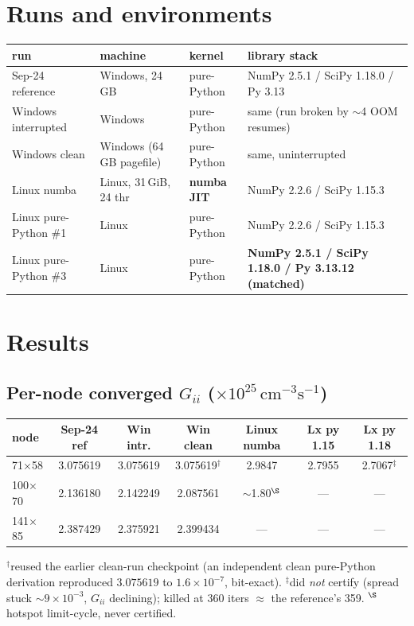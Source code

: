\documentclass[11pt]{article}
\newcommand{\ten}[1]{\times 10^{#1}}
\begin{document}
\section{Runs and environments}
\begin{center}\small
\begin{tabular}{llll}
\toprule
run & machine & kernel & library stack \\
\midrule
Sep-24 reference      & Windows, 24\,GB & pure-Python & NumPy 2.5.1 / SciPy 1.18.0 / Py 3.13 \\
Windows interrupted   & Windows & pure-Python & same (run broken by $\sim$4 OOM resumes) \\
Windows clean         & Windows (64\,GB pagefile) & pure-Python & same, uninterrupted \\
Linux numba           & Linux, 31\,GiB, 24 thr & \textbf{numba JIT} & NumPy 2.2.6 / SciPy 1.15.3 \\
Linux pure-Python \#1 & Linux & pure-Python & NumPy 2.2.6 / SciPy 1.15.3 \\
Linux pure-Python \#3 & Linux & pure-Python & \textbf{NumPy 2.5.1 / SciPy 1.18.0 / Py 3.13.12 (matched)} \\
\bottomrule
\end{tabular}
\end{center}

\section{Results}
\subsection{Per-node converged $G_{ii}$ ($\ten{25}\,\mathrm{cm^{-3}s^{-1}}$)}
\begin{center}\small
\begin{tabular}{l c c c c c c}
\toprule
node & Sep-24 ref & Win intr. & Win clean & Linux numba & Lx py 1.15 & Lx py 1.18 \\
\midrule
71$\times$58  & 3.075619 & 3.075619 & 3.075619$^{\dagger}$ & 2.9847 & 2.7955 & 2.7067$^{\ddagger}$ \\
100$\times$70 & 2.136180 & 2.142249 & 2.087561 & $\sim$1.80$^{\S}$ & --- & --- \\
141$\times$85 & 2.387429 & 2.375921 & 2.399434 & --- & --- & --- \\
\bottomrule
\end{tabular}
\end{center}
{\footnotesize $^{\dagger}$reused the earlier clean-run checkpoint (an independent clean pure-Python derivation reproduced $3.075619$ to $1.6\ten{-7}$, bit-exact). $^{\ddagger}$did \emph{not} certify (spread stuck $\sim9\ten{-3}$, $G_{ii}$ declining); killed at 360 iters $\approx$ the reference's 359. $^{\S}$hotspot limit-cycle, never certified.}
\end{document}
